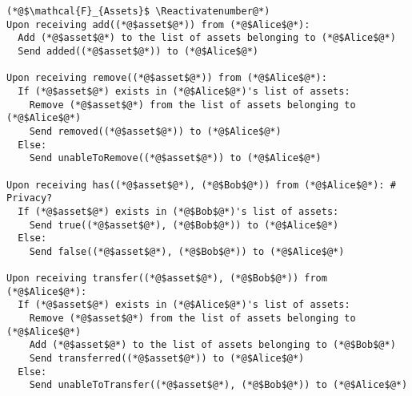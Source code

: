 \Suppressnumber
\begin{lstlisting}[label=assetsfunc, style=numbers]
(*@$\mathcal{F}_{Assets}$ \Reactivatenumber@*)
Upon receiving add((*@$asset$@*)) from (*@$Alice$@*):
  Add (*@$asset$@*) to the list of assets belonging to (*@$Alice$@*)
  Send added((*@$asset$@*)) to (*@$Alice$@*)

Upon receiving remove((*@$asset$@*)) from (*@$Alice$@*):
  If (*@$asset$@*) exists in (*@$Alice$@*)'s list of assets:
    Remove (*@$asset$@*) from the list of assets belonging to (*@$Alice$@*)
    Send removed((*@$asset$@*)) to (*@$Alice$@*)
  Else:
    Send unableToRemove((*@$asset$@*)) to (*@$Alice$@*)

Upon receiving has((*@$asset$@*), (*@$Bob$@*)) from (*@$Alice$@*): # Privacy?
  If (*@$asset$@*) exists in (*@$Bob$@*)'s list of assets:
    Send true((*@$asset$@*), (*@$Bob$@*)) to (*@$Alice$@*)
  Else:
    Send false((*@$asset$@*), (*@$Bob$@*)) to (*@$Alice$@*)

Upon receiving transfer((*@$asset$@*), (*@$Bob$@*)) from (*@$Alice$@*):
  If (*@$asset$@*) exists in (*@$Alice$@*)'s list of assets:
    Remove (*@$asset$@*) from the list of assets belonging to (*@$Alice$@*)
    Add (*@$asset$@*) to the list of assets belonging to (*@$Bob$@*)
    Send transferred((*@$asset$@*)) to (*@$Alice$@*)
  Else:
    Send unableToTransfer((*@$asset$@*), (*@$Bob$@*)) to (*@$Alice$@*)
\end{lstlisting}
